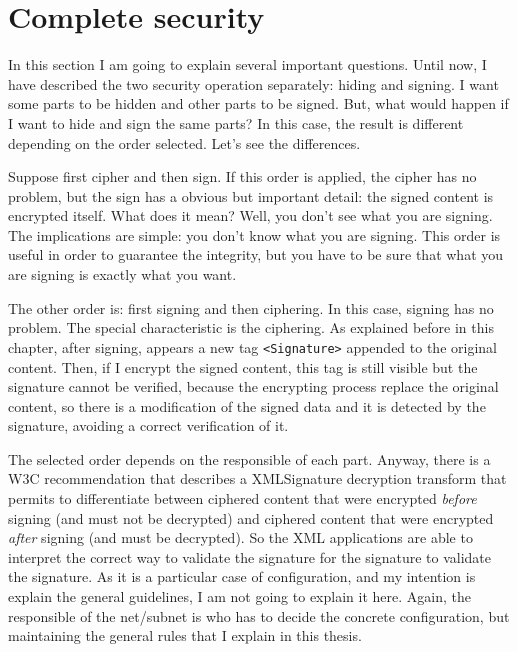 \section{Complete security}

In this section I am going to explain several important questions.
Until now, I have described the two security operation separately: hiding
and signing. I want some parts to be hidden and other parts to be signed.
But, what would happen if I want to hide and sign the same parts?
In this case, the result is different depending on the order selected. Let's
see the differences.

Suppose first cipher and then sign. If this order is applied, the cipher has no problem, but the sign has a obvious but important detail: the signed content is
encrypted itself. What does it mean? Well, you don't see what you are signing. The implications are simple: you don't know what you are signing. This order is useful in order to guarantee the integrity, but you have to be sure that what you are signing is exactly what you want.

The other order is: first signing and then ciphering. In this case, signing
has no problem. The special characteristic is the ciphering. As explained
before in this chapter, after signing, appears a new tag \texttt{<Signature>}
appended to the original content. Then, if I encrypt the signed content,
this tag is still visible but the signature cannot be verified, because the
encrypting process replace the original content, so there is a modification
of the signed data and it is detected by the signature, avoiding a correct
verification of it.

The selected order depends on the responsible of each part. Anyway, there
is a W3C recommendation that describes a XMLSignature decryption transform \cite{XMLSIG-w3.org/xmlenc-decrypt} that permits to differentiate between ciphered content that were encrypted \emph{before} signing (and must not be decrypted) and ciphered content that were encrypted \emph{after} signing (and must be decrypted). So the XML applications are able to interpret the correct
way to validate the signature  for the signature to validate the signature. As it is a particular case of configuration, and my intention is explain the general guidelines, I am not going to explain it here. Again, the responsible of the net/subnet is who has to decide the concrete configuration, but maintaining the general rules that I explain in this thesis.

